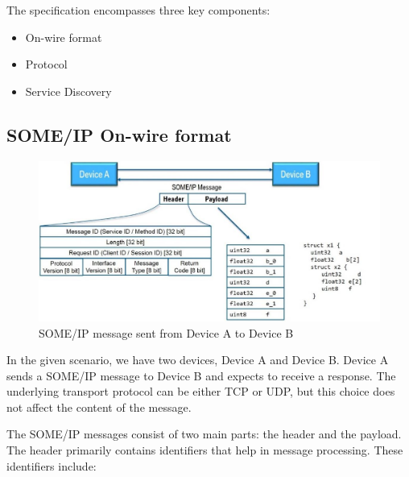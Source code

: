 \documentclass[
12pt,
oneside, 
onehalfspacing, 
nolistspacing, 
parskip, 
chapterinoneline, 
]{AASTCOMPUTER}
\begin{document}
The specification encompasses three key components:

\begin{itemize}
\item On-wire format
\item Protocol
\item Service Discovery
\end{itemize}

\subsection{SOME/IP On-wire format}
\begin{figure}[!ht]
\centering
\includegraphics[scale=0.3]{Figures/18.png}
\caption[SOMEIP message sent from Device A to Device B]{SOME/IP message sent from Device A to Device B}
\label{fig:SOME/IP On-wire format}
\end{figure}


In the given scenario, we have two devices, Device A and Device B. Device A sends a SOME/IP message to Device B and expects to receive a response. The underlying transport protocol can be either TCP or UDP, but this choice does not affect the content of the message.

The SOME/IP messages consist of two main parts: the header and the payload. The header primarily contains identifiers that help in message processing. These identifiers include:
\end{document}
